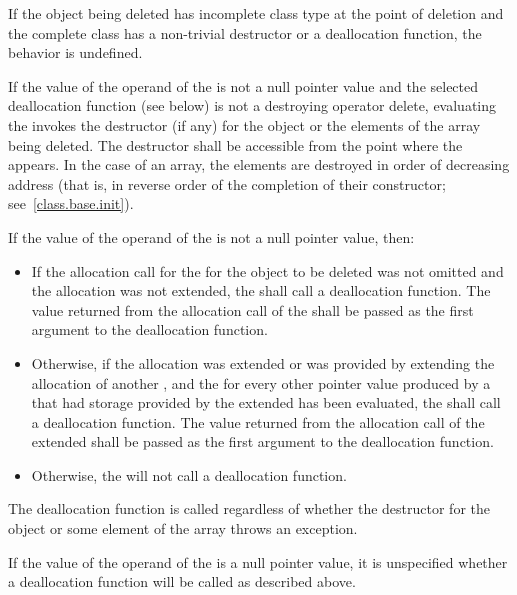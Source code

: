 \pnum
{}%
If the object being deleted has incomplete class type at the point of
deletion and the complete class has a non-trivial destructor or a
deallocation function, the behavior is undefined.

\pnum
{}%
If the value of the operand of the  is not a
null pointer value
and the selected deallocation function (see below)
is not a destroying operator delete,
evaluating the  invokes the
destructor (if any) for the object or the elements of the array being
deleted.
The destructor shall be accessible from the point where
the  appears.
In the case of an array, the elements are destroyed in
order of decreasing address (that is, in reverse order of the completion
of their constructor; see~\ref{class.base.init}).

\pnum
If the value of the operand of the  is not a
null pointer value, then:

\begin{itemize}
\item
If the allocation call for the  for the object to
be deleted was not omitted and the allocation was not extended, the
 shall call a deallocation
function. The value returned from the
allocation call of the  shall be passed as the
first argument to the deallocation function.

\item
Otherwise, if the allocation was extended or was provided by extending the
allocation of another , and the
 for every other pointer value produced by a
 that had storage provided by the extended
 has been evaluated, the
 shall call a deallocation function. The value
returned from the allocation call of the extended 
shall be passed as the first argument to the deallocation function.

\item
Otherwise, the  will not call a
deallocation function.
\end{itemize}
\begin{note}
The deallocation function is called regardless of whether the destructor
for the object or some element of the array throws an exception.
\end{note}
If the value of the operand of the  is a
null pointer value, it is unspecified whether a deallocation function will be
called as described above.

